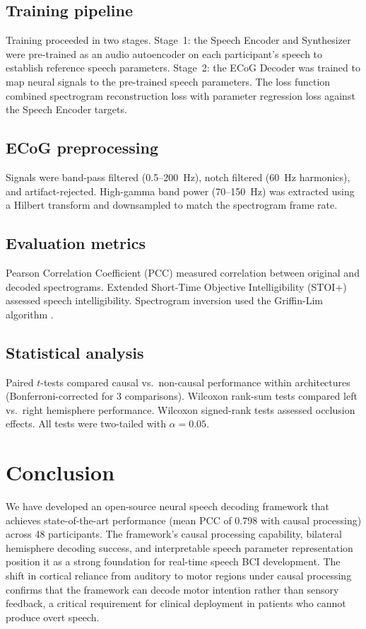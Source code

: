 \documentclass[11pt]{article}
\begin{document}
\subsection{Training pipeline}

Training proceeded in two stages. Stage~1: the Speech Encoder and Synthesizer were pre-trained as an audio autoencoder on each participant's speech to establish reference speech parameters. Stage~2: the ECoG Decoder was trained to map neural signals to the pre-trained speech parameters. The loss function combined spectrogram reconstruction loss with parameter regression loss against the Speech Encoder targets.

\subsection{ECoG preprocessing}

Signals were band-pass filtered (0.5--200~Hz), notch filtered (60~Hz harmonics), and artifact-rejected. High-gamma band power (70--150~Hz) was extracted using a Hilbert transform \citep{crone2001} and downsampled to match the spectrogram frame rate.

\subsection{Evaluation metrics}

Pearson Correlation Coefficient (PCC) measured correlation between original and decoded spectrograms. Extended Short-Time Objective Intelligibility (STOI+) \citep{taal2011} assessed speech intelligibility. Spectrogram inversion used the Griffin-Lim algorithm \citep{griffin1984}.

\subsection{Statistical analysis}

Paired $t$-tests compared causal vs.\ non-causal performance within architectures (Bonferroni-corrected for 3 comparisons). Wilcoxon rank-sum tests compared left vs.\ right hemisphere performance. Wilcoxon signed-rank tests assessed occlusion effects. All tests were two-tailed with $\alpha = 0.05$.

\section{Conclusion}

We have developed an open-source neural speech decoding framework that achieves state-of-the-art performance (mean PCC of 0.798 with causal processing) across 48 participants. The framework's causal processing capability, bilateral hemisphere decoding success, and interpretable speech parameter representation position it as a strong foundation for real-time speech BCI development. The shift in cortical reliance from auditory to motor regions under causal processing confirms that the framework can decode motor intention rather than sensory feedback, a critical requirement for clinical deployment in patients who cannot produce overt speech.



\end{document}
